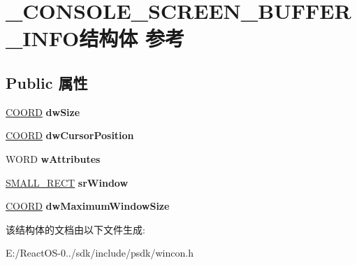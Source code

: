 \hypertarget{struct___c_o_n_s_o_l_e___s_c_r_e_e_n___b_u_f_f_e_r___i_n_f_o}{}\section{\+\_\+\+C\+O\+N\+S\+O\+L\+E\+\_\+\+S\+C\+R\+E\+E\+N\+\_\+\+B\+U\+F\+F\+E\+R\+\_\+\+I\+N\+F\+O结构体 参考}
\label{struct___c_o_n_s_o_l_e___s_c_r_e_e_n___b_u_f_f_e_r___i_n_f_o}
\subsection*{Public 属性}
\begin{DoxyCompactItemize}
\item 
\mbox{\label{struct___c_o_n_s_o_l_e___s_c_r_e_e_n___b_u_f_f_e_r___i_n_f_o_af0bcc0dbea835841f1c6797fdbc559c4}} 
\hyperlink{struct___c_o_o_r_d}{C\+O\+O\+RD} {\bfseries dw\+Size}
\item 
\mbox{\label{struct___c_o_n_s_o_l_e___s_c_r_e_e_n___b_u_f_f_e_r___i_n_f_o_a0cda11f5772dadbc15542f91942fd70b}} 
\hyperlink{struct___c_o_o_r_d}{C\+O\+O\+RD} {\bfseries dw\+Cursor\+Position}
\item 
\mbox{\label{struct___c_o_n_s_o_l_e___s_c_r_e_e_n___b_u_f_f_e_r___i_n_f_o_af7112529fe8cdc323c61bfbcc482d351}} 
W\+O\+RD {\bfseries w\+Attributes}
\item 
\mbox{\label{struct___c_o_n_s_o_l_e___s_c_r_e_e_n___b_u_f_f_e_r___i_n_f_o_add4900bf30b7cd0b148f525173895597}} 
\hyperlink{structtag_s_m_a_l_l___r_e_c_t}{S\+M\+A\+L\+L\+\_\+\+R\+E\+CT} {\bfseries sr\+Window}
\item 
\mbox{\label{struct___c_o_n_s_o_l_e___s_c_r_e_e_n___b_u_f_f_e_r___i_n_f_o_a13a40fed7dad2e41747c00c9b03bfb52}} 
\hyperlink{struct___c_o_o_r_d}{C\+O\+O\+RD} {\bfseries dw\+Maximum\+Window\+Size}
\end{DoxyCompactItemize}


该结构体的文档由以下文件生成\+:\begin{DoxyCompactItemize}
\item 
E\+:/\+React\+O\+S-\/0../sdk/include/psdk/wincon.\+h\end{DoxyCompactItemize}
